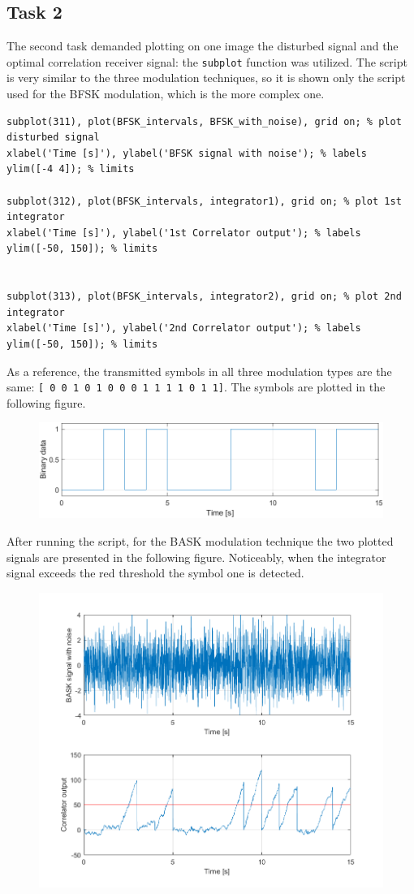 \subsection*{Task 2}
The second task demanded plotting on one image the disturbed signal and the optimal correlation receiver signal: the \texttt{subplot} function was utilized. The script is very similar to the three modulation techniques, so it is shown only the script used for the BFSK modulation, which is the more complex one.

\begin{lstlisting}
subplot(311), plot(BFSK_intervals, BFSK_with_noise), grid on; % plot disturbed signal
xlabel('Time [s]'), ylabel('BFSK signal with noise'); % labels
ylim([-4 4]); % limits

subplot(312), plot(BFSK_intervals, integrator1), grid on; % plot 1st integrator
xlabel('Time [s]'), ylabel('1st Correlator output'); % labels
ylim([-50, 150]); % limits


subplot(313), plot(BFSK_intervals, integrator2), grid on; % plot 2nd integrator
xlabel('Time [s]'), ylabel('2nd Correlator output'); % labels
ylim([-50, 150]); % limits
\end{lstlisting}

\noindent As a reference, the transmitted symbols in all three modulation types are the same: \texttt{[ 0 0 1 0 1 0 0 0 1 1 1 1 0 1 1]}. The symbols are plotted in the following figure.

\begin{figure}[h!]
    \centering
    \includegraphics[width = .7\textwidth]{lab-4/imgs/initial-data.png}
\end{figure}

\FloatBarrier\noindent After running the script, for the BASK modulation technique the two plotted signals are presented in the following figure. Noticeably, when the integrator signal exceeds the red threshold the symbol one is detected.

\begin{figure}[h!]
    \centering
    \includegraphics[width = .7\textwidth]{lab-4/imgs/BASK.png}
\end{figure}

